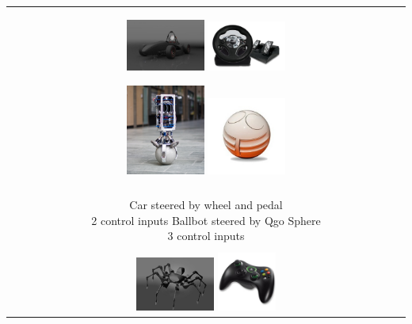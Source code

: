 \begin{table}[H]
\begin{center}
 \begin{tabular}{M}
 \hline \hline \vspace{3px}
 \parbox{\textwidth}{ \centering
 \parbox{0.45\textwidth}{ \centering
 \includegraphics[width=0.2\textwidth]{amz}
 \includegraphics[width=0.2\textwidth]{steeringwheel}
 }
 \parbox{0.45\textwidth}{ \centering
 \includegraphics[width=0.2\textwidth]{rezero}
 \includegraphics[width=0.2\textwidth]{qgosphere}
 }} \\
 \vspace{6mm} \\
 \parbox{0.45\textwidth}{\centering Car steered by wheel and pedal \\ 2 control inputs}
 \parbox{0.45\textwidth}{\centering Ballbot steered by Qgo Sphere \\ 3 control inputs} \\
 \hline \\
 \parbox{\textwidth}{ \centering
 \parbox{0.45\textwidth}{ \centering
 \includegraphics[width=0.2\textwidth]{arac}
 \includegraphics[width=0.15\textwidth]{gamepad}
}}
\end{tabular}
\end{center}
\end{table}
